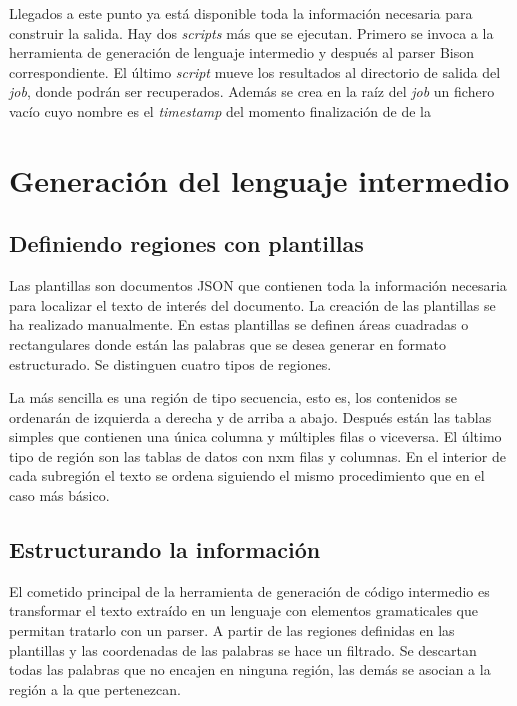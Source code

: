 Llegados a este punto ya está disponible toda la información necesaria para construir la salida. Hay dos \emph{scripts} más que se ejecutan. Primero se invoca a la herramienta de generación de lenguaje intermedio y después al parser Bison correspondiente. El último \emph{script} mueve los resultados al directorio de salida del \emph{job}, donde podrán ser recuperados. Además se crea en la raíz del \emph{job} un fichero vacío cuyo nombre es el \emph{timestamp} del momento finalización de de la %

\section{Generación del lenguaje intermedio}

\subsection{Definiendo regiones con plantillas}

Las plantillas son documentos JSON que contienen toda la información necesaria para localizar el texto de interés del documento. La creación de las plantillas se ha realizado manualmente. En estas plantillas se definen áreas cuadradas o rectangulares donde están las palabras que se desea generar en formato estructurado. Se distinguen cuatro tipos de regiones.

La más sencilla es una región de tipo secuencia, esto es, los contenidos se ordenarán de izquierda a derecha y de arriba a abajo. Después están las tablas simples que contienen una única columna y múltiples filas o viceversa. El último tipo de región son las tablas de datos con nxm filas y columnas. En el interior de cada subregión el texto se ordena siguiendo el mismo procedimiento que en el caso más básico.


\subsection{Estructurando la información}

El cometido principal de la herramienta de generación de código intermedio es transformar el texto extraído en un lenguaje con elementos gramaticales que permitan tratarlo con un parser. A partir de las regiones definidas en las plantillas y las coordenadas de las palabras se hace un filtrado. Se descartan todas las palabras que no encajen en ninguna región, las demás se asocian a la región a la que pertenezcan.

